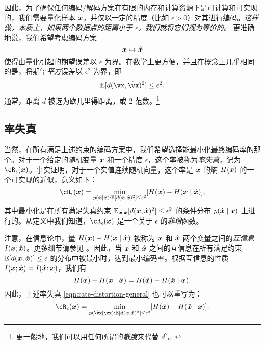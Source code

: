 \documentclass[../../book-main_zh.tex]{subfiles}
\begin{document}
因此，为了确保任何编码/解码方案在有限的内存和计算资源下是可计算和可实现的，我们需要量化样本 $\bm{x}$，并仅以一定的精度（比如 $\epsilon > 0$）对其进行编码。{\em 这样做，本质上，如果两个数据点的距离小于 $\epsilon$，我们就将它们视为等价的。} 更准确地说，我们希望考虑编码方案
\begin{equation}
	\bm{x} \mapsto \hat {\bm{x}}
\end{equation}
使得由量化引起的期望误差以 $\epsilon$ 为界。在数学上更方便，并且在概念上几乎相同的是，将期望\textit{平方}误差以 \(\epsilon^{2}\) 为界，即
\begin{equation}
	\Ex[d(\vx, \hat \vx)^{2}] \le \epsilon^{2}.
\end{equation}
通常，距离 \(d\) 被选为欧几里得距离，或 2-范数。\footnote{更一般地，我们可以用任何所谓的\textit{散度}来代替 \(d^{2}\)。}

\subsection{率失真}
当然，在所有满足上述约束的编码方案中，我们希望选择能最小化最终编码率的那个。对于一个给定的随机变量 $\bm{x}$ 和一个精度 $\epsilon$，这个率被称为{\em 率失真}，记为 $\cR_{\epsilon}(\x)$。事实证明，对于一个实值连续随机向量，这个率是 $\bm{x}$ 的熵 $H(\bm{x})$ 的一个可实现的近似，意义如下：
\begin{equation}
	\cR_{\epsilon}(\x) = \min_{p(\hat \x \mid \x): \Ex[d(\x, \hat \x)^{2}] \le \epsilon^{2}} [H(\x) - H(\x \mid \hat{\x})],
    \label{eqn:rate-distortion-general}
\end{equation}
其中最小化是在所有满足失真约束 $\operatorname{\mathbb{E}}_{\bm{x}, \hat {\bm{x}}}[d(\bm{x}, \hat {\bm{x}})^{2}] \le \epsilon^{2}$ 的条件分布 $p(\hat {\bm{x}} \mid \bm{x})$ 上进行的。从定义中我们知道，$\cR_{\epsilon}(\x)$ 是一个关于 $\epsilon$ 的{\em 非增}函数。

\begin{remark}
	注意，在信息论中，量 $H(\bm{x}) - H(\bm{x} \mid \hat {\bm{x}})$ 被称为 $\bm{x}$ 和 $\hat {\bm{x}}$ 两个变量之间的{\em 互信息} $I(\bm{x}; \hat {\bm{x}})$。更多细节请参见 \cite{Cover-Thomas}。因此，当 $\bm{x}$ 和 $\hat {\bm{x}}$ 之间的互信息在所有满足约束 $\mathbb{E} [d(\bm{x}, \hat {\bm{x}})] \le \epsilon$ 的分布中被最小时，达到最小编码率。根据互信息的性质 $I(\bm{x}; \hat {\bm{x}}) = I(\hat {\bm{x}}; \bm{x})$，我们有
	\begin{equation}
        H(\bm{x}) - H(\bm{x} \mid \hat{\bm{x}}) = H(\hat{\bm{x}}) - H(\hat{\bm{x}} \mid {\bm{x}}).
    \end{equation}
    因此，上述率失真 \eqref{eqn:rate-distortion-general} 也可以重写为：
    \begin{equation}
		\cR_{\epsilon}(\x) = \min_{p(\hat \vx \mid \vx): \mathbb{E} [d(\x, \hat \x)^{2}] \le \epsilon^{2}} [H(\hat \x) - H(\hat \x \mid \x)].  \label{eqn:rate-distortion-general-2}
	\end{equation}
\end{remark}
\end{document}
